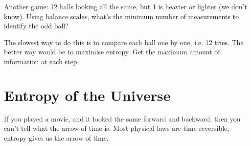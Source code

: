 \documentclass[a4paper, 11pt, normalem]{report}
\begin{document}
\begin{example}
    Another game: 12 balls looking all the same, but 1 is heavier or lighter (we don't know). 
    Using balance scales, what's the minimum number of measurements to identify the odd ball?

    The slowest way to do this is to compare each ball one by one, i.e. 12 tries. 
    The better way would be to maximise entropy. 
    Get the maximum amount of information at each step.
\end{example}

\section{Entropy of the Universe}
If you played a movie, and it looked the same forward and backward, then you can't tell what the arrow of time is. 
Most physical laws are time reversible, entropy gives us the arrow of time. 
\end{document}
